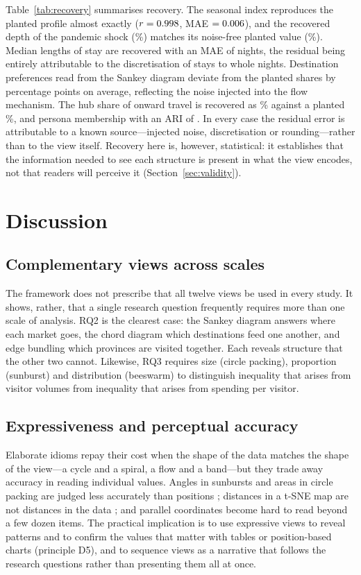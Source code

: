 \documentclass{article}
\begin{document}
Table~\ref{tab:recovery} summarises recovery. The seasonal index reproduces the planted profile almost exactly
($r = 0.998$, MAE $= 0.006$), and the recovered depth of the pandemic shock (\RecDropObs\%) matches
its noise-free planted value (\RecDropPlanted\%). Median lengths of stay are recovered with an MAE of
\RecStayMae{} nights, the residual being entirely attributable to the discretisation of stays to whole nights.
Destination preferences read from the Sankey diagram deviate from the planted shares by \RecDestMae{}
percentage points on average, reflecting the noise injected into the flow mechanism. The hub share of onward
travel is recovered as \RecHubObs\% against a planted \RecHubPlanted\%, and persona membership with an ARI of
\SegAri. In every case the residual error is attributable to a known source---injected noise, discretisation
or rounding---rather than to the view itself. Recovery here is, however, statistical: it establishes that the
information needed to see each structure is present in what the view encodes, not that readers will perceive
it (Section~\ref{sec:validity}).

\section{Discussion}\label{sec:discussion}

\subsection{Complementary views across scales}
The framework does not prescribe that all twelve views be used in every study. It shows, rather, that a single
research question frequently requires more than one scale of analysis. RQ2 is the clearest case: the Sankey
diagram answers where each market goes, the chord diagram which destinations feed one another, and edge
bundling which provinces are visited together. Each reveals structure that the other two cannot. Likewise, RQ3
requires size (circle packing), proportion (sunburst) and distribution (beeswarm) to distinguish inequality
that arises from visitor volumes from inequality that arises from spending per visitor.

\subsection{Expressiveness and perceptual accuracy}
Elaborate idioms repay their cost when the shape of the data matches the shape of the view---a cycle and a
spiral, a flow and a band---but they trade away accuracy in reading individual values. Angles in sunbursts and
areas in circle packing are judged less accurately than positions \citep{cleveland1984}; distances in a t-SNE
map are not distances in the data \citep{wattenberg2016}; and parallel coordinates become hard to read beyond a
few dozen items. The practical implication is to use expressive views to reveal patterns and to confirm the
values that matter with tables or position-based charts (principle D5), and to sequence views as a narrative
that follows the research questions \citep{segel2010} rather than presenting them all at once.
\end{document}
